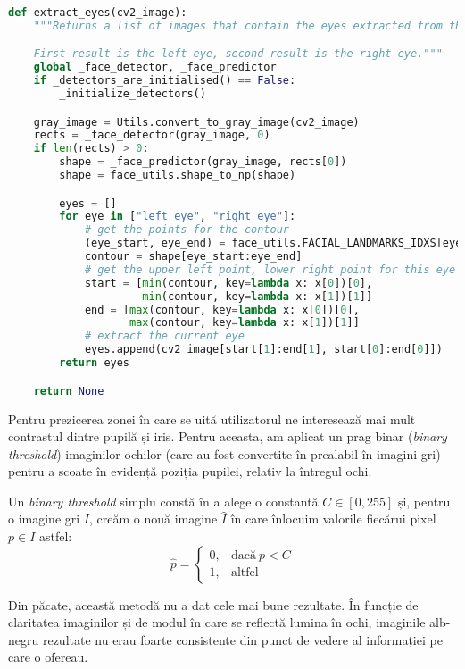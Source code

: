 \begin{lstlisting}[language=Python, caption=Extragerea ochilor dintr-o imagine]
def extract_eyes(cv2_image):
    """Returns a list of images that contain the eyes extracted from the original image.

    First result is the left eye, second result is the right eye."""
    global _face_detector, _face_predictor
    if _detectors_are_initialised() == False:
        _initialize_detectors()

    gray_image = Utils.convert_to_gray_image(cv2_image)
    rects = _face_detector(gray_image, 0)
    if len(rects) > 0:
        shape = _face_predictor(gray_image, rects[0])
        shape = face_utils.shape_to_np(shape)

        eyes = []
        for eye in ["left_eye", "right_eye"]:
            # get the points for the contour
            (eye_start, eye_end) = face_utils.FACIAL_LANDMARKS_IDXS[eye]
            contour = shape[eye_start:eye_end]
            # get the upper left point, lower right point for this eye
            start = [min(contour, key=lambda x: x[0])[0],
                     min(contour, key=lambda x: x[1])[1]]
            end = [max(contour, key=lambda x: x[0])[0],
                   max(contour, key=lambda x: x[1])[1]]
            # extract the current eye
            eyes.append(cv2_image[start[1]:end[1], start[0]:end[0]])
        return eyes

    return None
\end{lstlisting}

Pentru prezicerea zonei în care se uită utilizatorul ne interesează mai mult contrastul dintre pupilă și iris.
Pentru aceasta, am aplicat un prag binar (\emph{binary threshold}) imaginilor ochilor (care au fost convertite în prealabil în imagini gri) pentru a scoate în evidență poziția pupilei, relativ la întregul ochi.

Un \emph{binary threshold} simplu constă în a alege o constantă $C \in [0, 255]$ și, pentru o imagine gri $I$, creăm o nouă imagine $\hat{I}$ în care înlocuim valorile fiecărui pixel $p \in I$ astfel:
\begin{equation}
    \hat{p} =
    \begin{cases}
      0, & \text{dacă}\ p < C \\
      1, & \text{altfel}
    \end{cases}
  \end{equation}

Din păcate, această metodă nu a dat cele mai bune rezultate.
În funcție de claritatea imaginilor și de modul în care se reflectă lumina în ochi, imaginile alb-negru rezultate nu erau foarte consistente din punct de vedere al informației pe care o ofereau.

